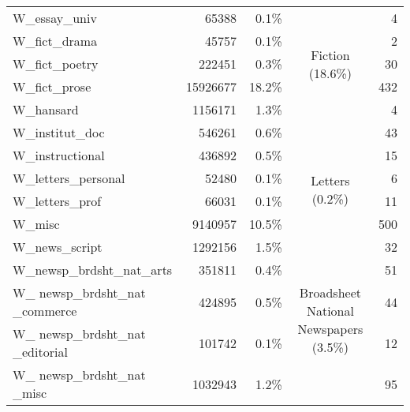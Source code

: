{\begin{tabular}{lrrcr}
        W\_essay\_univ                     & 65388    & 0.1\%   &                                                         & 4     \\ \cline{4-4}
        W\_fict\_drama                     & 45757    & 0.1\%   & \multirow{3}{*}{\parbox{2.1cm}{Fiction (18.6\%)}}                       & 2     \\
        W\_fict\_poetry                    & 222451   & 0.3\%   &                                                         & 30    \\
        W\_fict\_prose                     & 15926677 & 18.2\%  &                                                         & 432   \\ \cline{4-4}
        W\_hansard                         & 1156171  & 1.3\%   &                                                         & 4     \\
        W\_institut\_doc                   & 546261   & 0.6\%   &                                                         & 43    \\
        W\_instructional                   & 436892   & 0.5\%   &                                                         & 15    \\ \cline{4-4}
        W\_letters\_personal               & 52480    & 0.1\%   & \multirow{2}{*}{\parbox{2.1cm}{Letters (0.2\%)}}                        & 6     \\
        W\_letters\_prof                   & 66031    & 0.1\%   &                                                         & 11    \\ \cline{4-4}
        W\_misc                            & 9140957  & 10.5\%  &                                                         & 500   \\ \cline{4-4}
        W\_news\_script                    & 1292156  & 1.5\%   & \multirow{9}{*}{\parbox{2.1cm}{Broadsheet National Newspapers (3.5\%)}} & 32    \\
        W\_newsp\_brdsht\_nat\_arts        & 351811   & 0.4\%   &                                                         & 51    \\
        W\_ newsp\_brdsht\_nat \_commerce  & 424895   & 0.5\%   &                                                         & 44    \\
        W\_ newsp\_brdsht\_nat \_editorial & 101742   & 0.1\%   &                                                         & 12    \\
        W\_ newsp\_brdsht\_nat \_misc      & 1032943  & 1.2\%   &                                                         & 95    \\

\end{tabular}}
